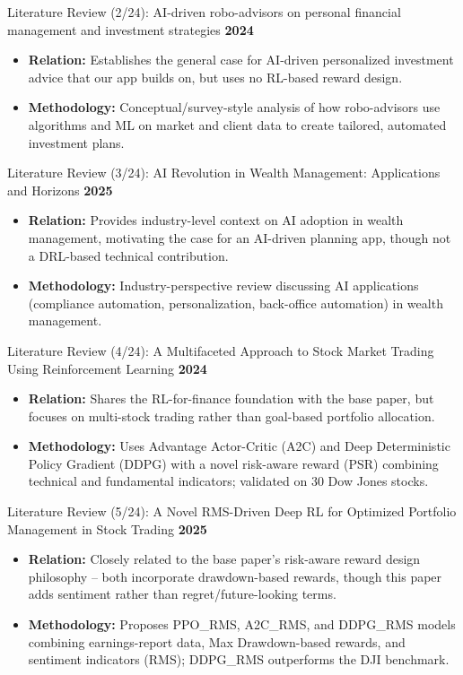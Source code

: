 \documentclass{beamer}
\begin{document}
\begin{frame}{Literature Review (2/24): AI-driven robo-advisors on personal financial management and investment strategies}
\small
\textbf{2024}
\begin{itemize}
    \item \textbf{Relation:} Establishes the general case for AI-driven personalized investment advice that our app builds on, but uses no RL-based reward design.
    \item \textbf{Methodology:} Conceptual/survey-style analysis of how robo-advisors use algorithms and ML on market and client data to create tailored, automated investment plans.
\end{itemize}
\end{frame}

\begin{frame}{Literature Review (3/24): AI Revolution in Wealth Management: Applications and Horizons}
\small
\textbf{2025}
\begin{itemize}
    \item \textbf{Relation:} Provides industry-level context on AI adoption in wealth management, motivating the case for an AI-driven planning app, though not a DRL-based technical contribution.
    \item \textbf{Methodology:} Industry-perspective review discussing AI applications (compliance automation, personalization, back-office automation) in wealth management.
\end{itemize}
\end{frame}

\begin{frame}{Literature Review (4/24): A Multifaceted Approach to Stock Market Trading Using Reinforcement Learning}
\small
\textbf{2024}
\begin{itemize}
    \item \textbf{Relation:} Shares the RL-for-finance foundation with the base paper, but focuses on multi-stock trading rather than goal-based portfolio allocation.
    \item \textbf{Methodology:} Uses Advantage Actor-Critic (A2C) and Deep Deterministic Policy Gradient (DDPG) with a novel risk-aware reward (PSR) combining technical and fundamental indicators; validated on 30 Dow Jones stocks.
\end{itemize}
\end{frame}

\begin{frame}{Literature Review (5/24): A Novel RMS-Driven Deep RL for Optimized Portfolio Management in Stock Trading}
\small
\textbf{2025}
\begin{itemize}
    \item \textbf{Relation:} Closely related to the base paper's risk-aware reward design philosophy -- both incorporate drawdown-based rewards, though this paper adds sentiment rather than regret/future-looking terms.
    \item \textbf{Methodology:} Proposes PPO\_RMS, A2C\_RMS, and DDPG\_RMS models combining earnings-report data, Max Drawdown-based rewards, and sentiment indicators (RMS); DDPG\_RMS outperforms the DJI benchmark.
\end{itemize}
\end{frame}
\end{document}
